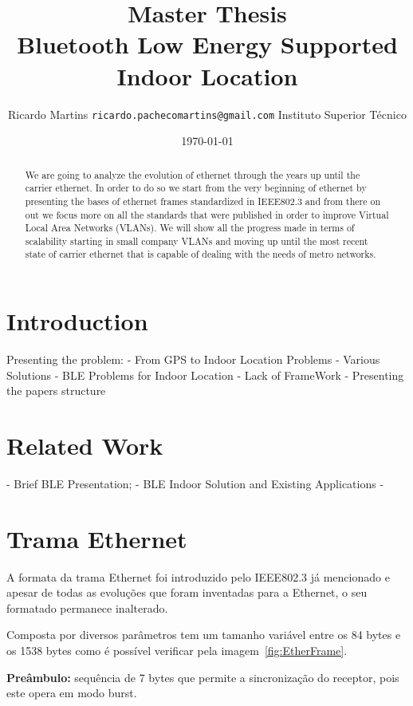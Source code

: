 \documentclass[a4paper]{IEEEtran}
\title{{ \normalsize Master Thesis} \\
	Bluetooth Low Energy Supported Indoor Location}
\author{
	Ricardo Martins {\tt ricardo.pachecomartins@gmail.com}
	Instituto Superior T\'{e}cnico}
\date{\today}
\begin{document}
\maketitle

\begin{abstract}
 We are going to analyze the evolution of ethernet through the years up until the carrier ethernet. In order to do so we start from the very beginning of ethernet by presenting the bases of ethernet frames standardized in IEEE802.3 and from there on out we focus more on all the standards that were published in order to improve Virtual Local Area Networks (VLANs). We will show all the progress made in terms of scalability starting in small company VLANs and moving up until the most recent state of carrier ethernet that is capable of dealing with the needs of metro networks. 

\end{abstract}

\section{Introduction}
\label{sec:Introduction}
Presenting the problem:
	- From GPS to Indoor Location Problems
	- Various Solutions
	- BLE Problems for Indoor Location
	- Lack of FrameWork
	- Presenting the papers structure

\section{Related Work}
\label{sec:RelatedWork}
	- Brief BLE Presentation;
	- BLE Indoor Solution and Existing Applications
	-

\section{Trama Ethernet}
\label{sec:Trama Ethernet}

A formata da trama Ethernet foi introduzido pelo IEEE802.3 já mencionado e apesar de todas as evoluções que foram inventadas para a Ethernet, o seu formatado permanece inalterado.

Composta por diversos parâmetros tem um tamanho variável entre os 84 bytes e os 1538 bytes como é possível verificar pela imagem~\ref{fig:EtherFrame}.



\textbf{Preâmbulo:} sequência de 7 bytes que permite a sincronização do receptor, pois este opera em modo burst.
\end{document}
